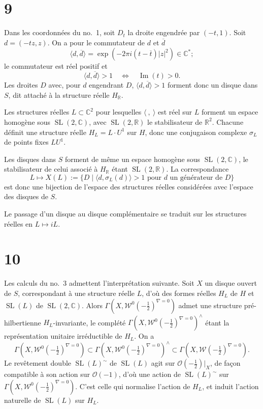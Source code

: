 \documentclass[11pt]{article}
\newcommand{\C}{\mathbb C}
\newcommand{\R}{\mathbb R}
\newcommand{\cO}{\mathcal O}
\newcommand{\cW}{\mathcal W}
\newcommand{\half}{\tfrac12}
\DeclareMathOperator{\SL}{SL}
\begin{document}
\section*{9}
Dans les coordonnées du no.~1, soit $D_t$ la droite engendrée par $(-t,1)$. Soit $d=(-tz,z)$. On a pour le commutateur de $d$ et $\overline d$
\[
\langle d,\overline d\rangle=\exp(-2\pi i(t-\overline t)|z|^2)\in\C^*;
\]
le commutateur est réel positif et
\[
\langle d,\overline d\rangle>1\quad\Longleftrightarrow\quad\operatorname{Im}(t)>0.
\]
Les droites $D$ avec, pour $d$ engendrant $D$, $\langle d,\overline d\rangle>1$ forment donc un disque dans $S$, dit attaché à la structure réelle $H_\R$.

Les structures réelles $L\subset\C^2$ pour lesquelles $\langle\ ,\ \rangle$ est réel sur $L$ forment un espace homogène sous $\SL(2,\C)$, avec $\SL(2,\R)$ le stabilisateur de $\R^2$. Chacune définit une structure réelle $H_L=L\cdot U^1$ sur $H$, donc une conjugaison complexe $\sigma_L$ de points fixes $LU^1$.

Les disques dans $S$ forment de même un espace homogène sous $\SL(2,\C)$, le stabilisateur de celui associé à $H_\R$ étant $\SL(2,\R)$. La correspondance
\[
L\longmapsto X(L):=\{D\mid\langle d,\sigma_L(d)\rangle>1\text{ pour }d\text{ un générateur de }D\}
\]
est donc une bijection de l'espace des structures réelles considérées avec l'espace des disques de $S$.

Le passage d'un disque au disque complémentaire se traduit sur les structures réelles en $L\mapsto iL$.

\section*{10}
Les calculs du no.~3 admettent l'interprétation suivante. Soit $X$ un disque ouvert de $S$, correspondant à une structure réelle $L$, d'où des formes réelles $H_L$ de $H$ et $\SL(L)$ de $\SL(2,\C)$. Alors $\Gamma(X,\cW^0(-\half)^{\nabla=0})$ admet une structure pré-hilbertienne $H_L$-invariante, le complété $\Gamma(X,\cW^0(-\half)^{\nabla=0})^\wedge$ étant la représentation unitaire irréductible de $H_L$. On a
\[
\Gamma(X,\cW^0(-\half)^{\nabla=0})
\subset
\Gamma(X,\cW^0(-\half)^{\nabla=0})^\wedge
\subset
\Gamma(X,\cW(-\half)^{\nabla=0}).
\]
Le revêtement double $\SL(L)^\sim$ de $\SL(L)$ agit sur $\cO(-\half)|_X$, de façon compatible à son action sur $\cO(-1)$, d'où une action de $\SL(L)^\sim$ sur $\Gamma(X,\cW^0(-\half)^{\nabla=0})$. C'est celle qui normalise l'action de $H_L$, et induit l'action naturelle de $\SL(L)$ sur $H_L$.
\end{document}
